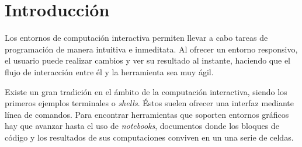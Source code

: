 \documentclass[11pt,spanish,listoffigures]{tfgetsinf}
\begin{document}
\clearpage
\begin{abstract}[english]
This project has consisted on the creation of a collaborative and permission-based environment for \textit{Jupyter}. \textit{Jupyter} is a tool for interactive computation in several programming languages. It offers a very visual and intuitive way of working, using interactive documents called notebooks, so adapting it to a collaborative ambit can be very interesting to its users. In order to reach the proposed objective several tasks have been carried out. For example the real-time synchronization of the notebooks, the implementation of a authentication, authorization and identification system for the users,  the notebook management and the creation of a persistence layer for the platform. The following technologies have been used: \textit{Tornado} for the web services, \textit{Auth0} for the authentication and \textit{SQLite} as the managing system for the database, amongst others.  As a result of the project we have obtained an application that, having room for improvement, fulfills all the planned functionalities successfully.

\end{abstract}


\mainmatter





\chapter{Introducci\'on}
\label{ch:intro}

Los entornos de computación interactiva permiten llevar a cabo tareas de programación de manera intuitiva e inmeditata. Al ofrecer un entorno responsivo, el usuario puede realizar cambios y ver su resultado al instante, haciendo que el flujo de interacción entre él y la herramienta sea muy ágil.

Existe un gran tradición en el ámbito de la computación interactiva, siendo los primeros ejemplos terminales o \textit{shells}. Éstos suelen ofrecer una interfaz mediante línea de comandos. Para encontrar herramientas que soporten entornos gráficos hay que avanzar hasta el uso de \textit{\gls{notebook}s}, documentos donde los bloques de código y los resultados de sus computaciones conviven en un una serie de celdas.
\end{document}

